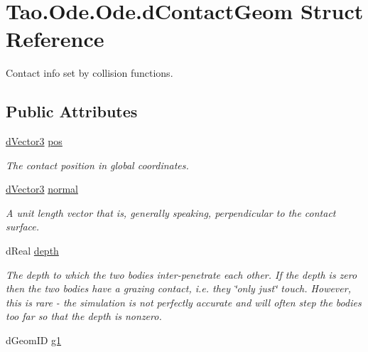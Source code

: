 \hypertarget{struct_tao_1_1_ode_1_1_ode_1_1d_contact_geom}{
\section{Tao.Ode.Ode.dContactGeom Struct Reference}
\label{struct_tao_1_1_ode_1_1_ode_1_1d_contact_geom}
}


Contact info set by collision functions.  


\subsection*{Public Attributes}
\begin{DoxyCompactItemize}
\item 
\hyperlink{struct_tao_1_1_ode_1_1_ode_1_1d_vector3}{dVector3} \hyperlink{struct_tao_1_1_ode_1_1_ode_1_1d_contact_geom_a6f79e3710102eb50d4842c2aba79d273}{pos}
\begin{DoxyCompactList}\small\item\em The contact position in global coordinates. \item\end{DoxyCompactList}\item 
\hyperlink{struct_tao_1_1_ode_1_1_ode_1_1d_vector3}{dVector3} \hyperlink{struct_tao_1_1_ode_1_1_ode_1_1d_contact_geom_af23489b991bf82f1e11363be14432f36}{normal}
\begin{DoxyCompactList}\small\item\em A unit length vector that is, generally speaking, perpendicular to the contact surface. \item\end{DoxyCompactList}\item 
dReal \hyperlink{struct_tao_1_1_ode_1_1_ode_1_1d_contact_geom_a648470146986b79fb8bab8d7de045436}{depth}
\begin{DoxyCompactList}\small\item\em The depth to which the two bodies inter-\/penetrate each other. If the depth is zero then the two bodies have a grazing contact, i.e. they \char`\"{}only just\char`\"{} touch. However, this is rare -\/ the simulation is not perfectly accurate and will often step the bodies too far so that the depth is nonzero. \item\end{DoxyCompactList}\item 
dGeomID \hyperlink{struct_tao_1_1_ode_1_1_ode_1_1d_contact_geom_a819c1e7e70bb41e8e70eff2c78e0fde2}{g1}

\end{DoxyCompactItemize}
